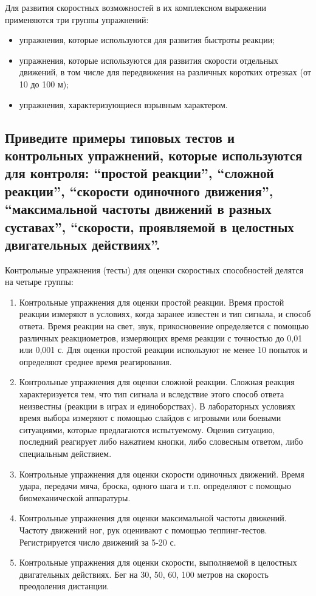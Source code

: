 Для развития скоростных возможностей в их комплексном выражении применяются три группы упражнений:
\begin{itemize}
    \item упражнения, которые используются для развития быстроты реакции;
    \item упражнения, которые используются для развития скорости отдельных движений, в том числе для передвижения на различных коротких отрезках (от 10 до 100 м);
    \item упражнения, характеризующиеся взрывным характером.
\end{itemize}


\subsection{Приведите примеры типовых тестов и контрольных упражнений, которые используются для контроля: ``простой реакции'', ``сложной реакции'', ``скорости одиночного движения'', ``максимальной частоты движений в разных суставах'', ``скорости, проявляемой в целостных двигательных действиях''.}

Контрольные упражнения (тесты) для оценки скоростных способностей делятся на четыре группы:
\begin{enumerate}
    \item Контрольные упражнения для оценки простой реакции.
          Время простой реакции измеряют в условиях, когда заранее известен и тип сигнала, и способ ответа.
          Время реакции на свет, звук, прикосновение определяется с помощью различных реакциометров,
          измеряющих время реакции с точностью до 0,01 или 0,001 с.
          Для оценки простой реакции используют не менее 10 попыток и определяют среднее время реагирования.
    \item Контрольные упражнения для оценки сложной реакции.
          Сложная реакция характеризуется тем, что тип сигнала и вследствие этого способ ответа неизвестны
          (реакции в играх и единоборствах). В лабораторных условиях время выбора измеряют с помощью слайдов с игровыми или
          боевыми ситуациями, которые предлагаются испытуемому. Оценив ситуацию, последний реагирует либо нажатием кнопки,
          либо словесным ответом, либо специальным действием.
    \item Контрольные упражнения для оценки скорости одиночных движений.
          Время удара, передачи мяча, броска, одного шага и т.п. определяют с помощью биомеханической аппаратуры.
    \item Контрольные упражнения для оценки максимальной частоты движений.
          Частоту движений ног, рук оценивают с помощью теппинг-тестов. Регистрируется число движений за 5-20 с.
    \item Контрольные упражнения для оценки скорости, выполняемой в целостных двигательных действиях.
          Бег на 30, 50, 60, 100 метров на скорость преодоления дистанции.
\end{enumerate}


